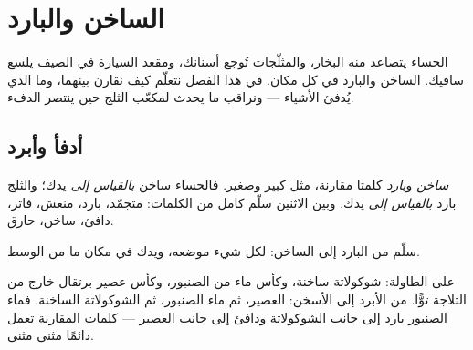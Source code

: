\chapter{الساخن والبارد}\label{ch:g1:hot-and-cold}

الحساء يتصاعد منه البخار، والمثلّجات تُوجع أسنانك، ومقعد السيارة في
الصيف يلسع ساقيك. الساخن والبارد في كل مكان. في هذا الفصل نتعلّم
كيف نقارن بينهما، وما الذي يُدفئ الأشياء --- ونراقب ما يحدث لمكعّب
الثلج حين ينتصر الدفء.

\section{أدفأ وأبرد}

\begin{definition}\label{def:g1:hot-and-cold:words}
\emph{ساخن} و\emph{بارد} كلمتا مقارنة،
مثل كبير وصغير. فالحساء ساخن \emph{بالقياس إلى} يدك؛ والثلج بارد
\emph{بالقياس إلى} يدك. وبين الاثنين سلّم كامل من الكلمات: متجمّد،
بارد، منعش، فاتر، دافئ، ساخن، حارق.
\end{definition}

\begin{omfigure}

{\small سلّم من البارد إلى الساخن: لكل شيء موضعه، ويدك في مكان ما
من الوسط.}
\end{omfigure}

\begin{example}\label{ex:g1:hot-and-cold:drinks}
على الطاولة: شوكولاتة ساخنة، وكأس ماء من الصنبور، وكأس عصير برتقال
خارج من الثلاجة توًّا. من الأبرد إلى الأسخن: العصير، ثم ماء الصنبور،
ثم الشوكولاتة الساخنة. فماء الصنبور بارد إلى جانب الشوكولاتة ودافئ
إلى جانب العصير --- كلمات المقارنة تعمل دائمًا مثنى مثنى.
\end{example}

